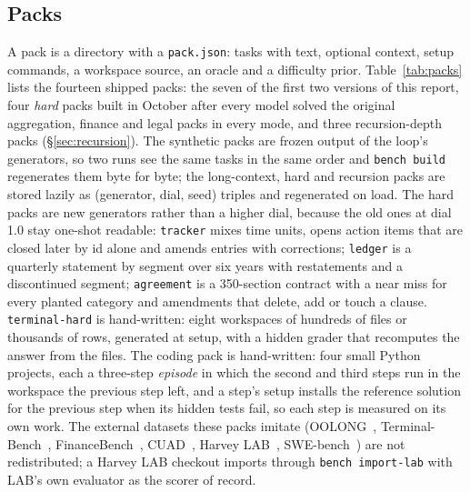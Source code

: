 \documentclass[11pt,a4paper]{article}
\newcommand{\code}[1]{\texttt{#1}}
\begin{document}
\subsection{Packs}

A pack is a directory with a \code{pack.json}: tasks with text, optional context,
setup commands, a workspace source, an oracle and a difficulty prior.
Table~\ref{tab:packs} lists the fourteen shipped packs: the seven of the
first two versions of this report, four \emph{hard} packs built in October
after every model solved the original aggregation, finance and legal packs
in every mode, and three recursion-depth packs (\S\ref{sec:recursion}). The
synthetic packs are frozen output of the loop's generators, so two runs see
the same tasks in the same order and \code{bench build} regenerates them
byte for byte; the long-context, hard and recursion packs are stored lazily
as (generator, dial, seed) triples and regenerated on load. The hard packs
are new generators rather than a higher dial, because the old ones at dial
1.0 stay one-shot readable: \code{tracker} mixes time units, opens action
items that are closed later by id alone and amends entries with
corrections; \code{ledger} is a quarterly statement by segment over six
years with restatements and a discontinued segment; \code{agreement} is a
350-section contract with a near miss for every planted category and
amendments that delete, add or touch a clause. \code{terminal-hard} is
hand-written: eight workspaces of hundreds of files or thousands of rows,
generated at setup, with a hidden grader that recomputes the answer from
the files. The coding pack is hand-written: four small Python
projects, each a three-step \emph{episode} in which the second and third steps
run in the workspace the previous step left, and a step's setup installs the
reference solution for the previous step when its hidden tests fail, so each
step is measured on its own work. The external datasets these packs imitate
(OOLONG~\citep{bertsch2025oolong}, Terminal-Bench~\citep{merrill2026terminalbench},
FinanceBench~\citep{islam2023financebench}, CUAD~\citep{hendrycks2021cuad},
Harvey LAB~\citep{harvey2026lab}, SWE-bench~\citep{jimenez2024swebench}) are not
redistributed; a Harvey LAB checkout imports through \code{bench import-lab}
with LAB's own evaluator as the scorer of record.
\end{document}
